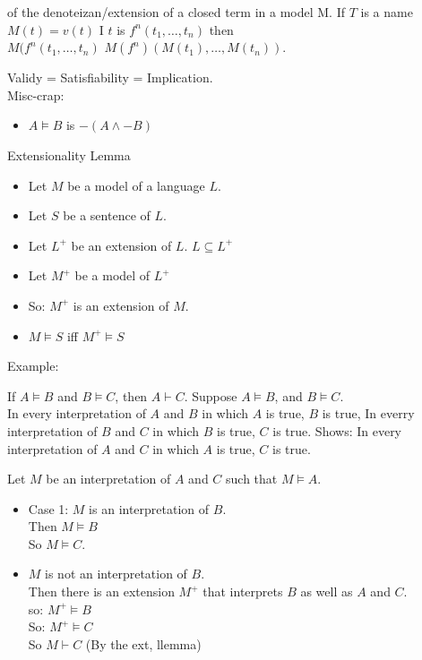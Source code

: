 \begin{definition}
of the denoteizan/extension of a closed term in a model M.
If $T$ is a name $M(t) = v(t)$
I $t$ is $f^n(t_1,\dots,t_n)$
then \\
$M(f^n(t_1,\dots,t_n)$
$M(f^n)(M(t_1),\dots,M(t_n)).$
\end{definition}

Validy = Satisfiability = Implication.\\

Misc-crap:
\begin{itemize}
\item $A \vDash B$ is $-(A \wedge -B)$
\end{itemize}

\begin{lemma}
Extensionality Lemma\\
\begin{itemize}
\item Let $M$ be a model of a language $L$.
\item Let $S$ be a sentence of $L$.
\item Let $L^+$ be an extension of $L$. $L \subseteq L^+$
\item Let $M^+$ be a model of $L^+$
\item So: $M^+$ is an extension of $M$.
\item $M \vDash S$ iff $ M^+ \vDash S$
\end{itemize}
\end{lemma}
Example:

If $A \vDash B$ and $B \vDash C$, then $A \vdash C$.
Suppose $A \vDash B$, and $B \vDash C$.\\
In every interpretation of $A$ and $B$ in which $A$ is true, $B$ is true,
In everry interpretation of $B$ and $C$ in which $B$ is true, $C$ is true.
Shows: In every interpretation of $A$ and $C$ in which $A$ is true, $C$ is true.

Let $M$ be an interpretation of $A$ and $C$ such that $M \vDash A$.
\begin{itemize}
\item Case 1:
$M$ is an interpretation of $B$. \\
Then $M \vDash B$ \\
So $M \vDash C$. \\
\item $M$ is not an interpretation of $B$. \\
Then there is an extension $M^+$ that interprets $B$ as well as $A$ and $C$. \\
so: $M^+ \vDash B$ \\
So: $M^+ \vDash C$ \\
So $M \vdash C$ (By the ext, llemma) \\
\end{itemize}
